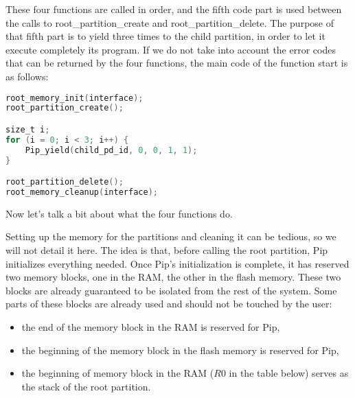 \documentclass[10pt,a4paper,titlepage]{refart}
\begin{document}
These four functions are called in order, and the fifth code part is used between the calls to root\_partition\_create and 
root\_partition\_delete. The purpose of that fifth part is to yield three times to the child partition, in order to let it execute 
completely its program. If we do not take into account the error codes that can be returned by the four functions, the main code of 
the function start is as follows:

\begin{lstlisting}[language=C]
root_memory_init(interface);
root_partition_create();

size_t i;
for (i = 0; i < 3; i++) {
    Pip_yield(child_pd_id, 0, 0, 1, 1);
}

root_partition_delete();
root_memory_cleanup(interface);
\end{lstlisting}

Now let's talk a bit about what the four functions do.


Setting up the memory for the partitions and cleaning it can be tedious, so we will not detail it here. The idea is that, before 
calling the root partition, Pip initializes everything needed. Once Pip's initialization is complete, it has reserved two memory 
blocks, one in the RAM, the other in the flash memory. These two blocks are already guaranteed to be isolated from the rest of the 
system. Some parts of these blocks are already used and should not be touched by the user:
\begin{itemize}
    \item the end of the memory block in the RAM is reserved for Pip,
    \item the beginning of the memory block in the flash memory is reserved for Pip,
    \item the beginning of memory block in the RAM ($R0$ in the table below) serves as the stack of the root partition.
\end{itemize}
\end{document}
